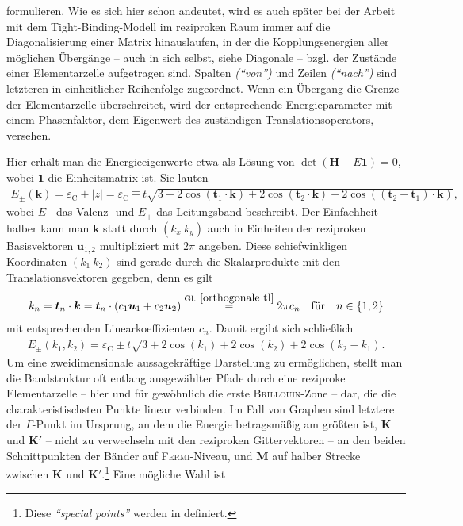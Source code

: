 \documentclass[a4paper, 10pt, twoside, openany]{book} %
\newcommand \braces[1]{\left \lbrace #1 \right \rbrace}
\def \vec {\boldsymbol}
\def \eC {\varepsilon_\mathrm{C}}
\begin{document}
	formulieren. Wie es sich hier schon andeutet, wird es auch später bei der Arbeit mit dem Tight-Binding-Modell im reziproken Raum immer auf die Diagonalisierung einer Matrix hinauslaufen, in der die Kopplungsenergien aller möglichen Übergänge -- auch in sich selbst, siehe Diagonale -- bzgl. der Zustände einer Elementarzelle aufgetragen sind. Spalten \emph{("`von"')} und Zeilen \emph{("`nach"')} sind letzteren in einheitlicher Reihenfolge zugeordnet. Wenn ein Übergang die Grenze der Elementarzelle überschreitet, wird der entsprechende Energieparameter mit einem Phasenfaktor, dem Eigenwert des zuständigen Translationsoperators, versehen.
	
	Hier erhält man die Energieeigenwerte etwa als Lösung von $\det(\vec H - E \vec 1) = 0$, wobei $\vec 1$ die Einheitsmatrix ist. Sie lauten
	\begin{align*}
		E_\pm(\vec k) = \eC \pm |z| = \eC \mp t \sqrt{3 + 2 \cos(\vec t_1 \cdot \vec k) + 2 \cos(\vec t_2 \cdot \vec k) + 2 \cos((\vec t_2 - \vec t_1) \cdot \vec k)},
	\end{align*}
    wobei $E_-$ das Valenz- und $E_+$ das Leitungsband beschreibt. Der Einfachheit halber kann man $\vec k$ statt durch $(k_x \ k_y)$ auch in Einheiten der reziproken Basisvektoren $\vec u_{1, 2}$ multipliziert mit $2 \pi$ angeben. Diese schiefwinkligen Koordinaten $(k_1 \ k_2)$ sind gerade durch die Skalarprodukte mit den Translationsvektoren gegeben, denn es gilt
	\begin{align}
		k_n = \vec t_n \cdot \vec k = \vec t_n \cdot (c_1 \vec u_1 + c_2 \vec u_2) \overset{\rm Gl.~\ref{orthogonale tl}} = 2 \pi c_n \quad \text{für} \quad n \in \braces{1, 2}
		\label{Koordinaten}
	\end{align}
	mit entsprechenden Linearkoeffizienten $c_n$. Damit ergibt sich schließlich
	\begin{align}
		E_\pm(k_1, k_2) = \eC \pm t \sqrt{3 + 2 \cos(k_1) + 2 \cos(k_2) + 2 \cos(k_2 - k_1)}.
		\label{Eigenenergien Graphen}
	\end{align}
	Um eine zweidimensionale aussagekräftige Darstellung zu ermöglichen, stellt man die Bandstruktur oft entlang ausgewählter Pfade durch eine reziproke Elementarzelle -- hier und für gewöhnlich die erste \textsc{Brillouin}-Zone -- dar, die die charakteristischsten Punkte linear verbinden.
	Im Fall von Graphen sind letztere der $\vec \varGamma$-Punkt im Ursprung, an dem die Energie betragsmäßig am größten ist, $\vec K$ und $\vec K'$ -- nicht zu verwechseln mit den reziproken Gittervektoren -- an den beiden Schnittpunkten der Bänder auf \textsc{Fermi}-Niveau, und $\vec M$ auf halber Strecke zwischen $\vec K$ und $\vec K'$.\footnote{Diese \emph{"`special points"'} werden in \cite[S.~6]{Katsnelson1} definiert.} Eine mögliche Wahl ist
\end{document}
